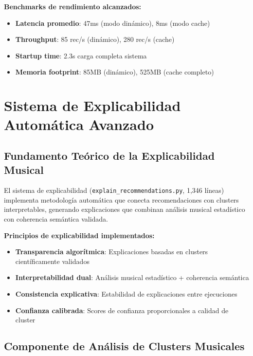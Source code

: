 \documentclass[12pt,a4paper]{report}
\begin{document}
\textbf{Benchmarks de rendimiento alcanzados:}
\begin{itemize}
    \item \textbf{Latencia promedio}: 47ms (modo dinámico), 8ms (modo cache)
    \item \textbf{Throughput}: 85 rec/s (dinámico), 280 rec/s (cache)
    \item \textbf{Startup time}: 2.3s carga completa sistema
    \item \textbf{Memoria footprint}: 85MB (dinámico), 525MB (cache completo)
\end{itemize}

\section{Sistema de Explicabilidad Automática Avanzado}

\subsection{Fundamento Teórico de la Explicabilidad Musical}

El sistema de explicabilidad (\texttt{explain\_recommendations.py}, 1,346 líneas) implementa metodología automática que conecta recomendaciones con clusters interpretables, generando explicaciones que combinan análisis musical estadístico con coherencia semántica validada.

\textbf{Principios de explicabilidad implementados:}
\begin{itemize}
    \item \textbf{Transparencia algorítmica}: Explicaciones basadas en clusters científicamente validados
    \item \textbf{Interpretabilidad dual}: Análisis musical estadístico + coherencia semántica
    \item \textbf{Consistencia explicativa}: Estabilidad de explicaciones entre ejecuciones
    \item \textbf{Confianza calibrada}: Scores de confianza proporcionales a calidad de cluster
\end{itemize}

\subsection{Componente de Análisis de Clusters Musicales}
\end{document}
